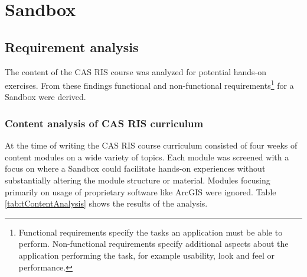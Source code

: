 \documentclass[11pt, a4paper, oneside, parskip=full-]{scrartcl}
\begin{document}
\section{Sandbox}

\subsection{Requirement analysis} \label{sectionrequirements}

The content of the CAS RIS course was analyzed for potential hands-on exercises.
From these findings functional and non-functional
requirements\footnote{Functional requirements specify the tasks an application
must be able to perform. Non-functional requirements specify additional aspects
about the application performing the task, for example usability, look and feel
or performance. } for a Sandbox were derived.

\subsubsection{Content analysis of CAS RIS curriculum}
At the time of writing the CAS RIS course curriculum consisted of four weeks of
content modules on a wide variety of topics. Each module was screened with a
focus on where a Sandbox could facilitate hands-on experiences without
substantially altering the module structure or material. Modules focusing
primarily on usage of proprietary software like ArcGIS were ignored. Table
\ref{tab:tContentAnalysis} shows the results of the analysis.
\end{document}
